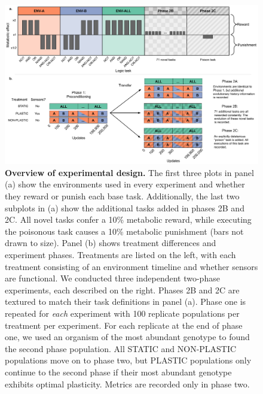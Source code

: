 \begin{figure}[h!]
    \centering
    \includegraphics[width=1\textwidth]{media/experimental-design.pdf}
    \caption{\small
    \textbf{Overview of experimental design.}
    The first three plots in panel (a) show the environments used in every experiment and whether they reward or punish each base task. 
    Additionally, the last two subplots in (a) show the additional tasks added in phases 2B and 2C. 
    All novel tasks confer a 10\% metabolic reward, while executing the poisonous task causes a 10\% metabolic punishment (bars not drawn to size). 
    Panel (b) shows treatment differences and experiment phases. 
    Treatments are listed on the left, with each treatment consisting of an environment timeline and whether sensors are functional. 
    We conducted three independent two-phase experiments, each described on the right.
    Phases 2B and 2C are textured to match their task definitions in panel (a). 
    Phase one is repeated for \textit{each} experiment with 100 replicate populations per treatment per experiment. 
    For each replicate at the end of phase one, we used an organism of the most abundant genotype to found the second phase population. 
    All STATIC and NON-PLASTIC populations move on to phase two, but PLASTIC populations only continue to the second phase if their most abundant genotype exhibits optimal plasticity. 
    Metrics are recorded only in phase two.
    }
    \label{fig:experimental-design}
\end{figure}